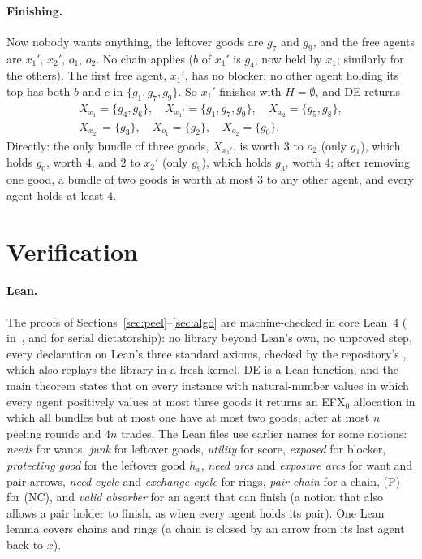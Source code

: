\documentclass[runningheads,11pt]{llncs}
\newcommand{\efxz}{\texorpdfstring{\mbox{EFX$_0$}}{EFX0}}
\newcommand{\DE}{\textup{DE}}
\begin{document}
\paragraph{Finishing.} Now nobody wants anything, the leftover goods are $g_7$ and $g_9$, and the free agents are $x_1'$, $x_2'$, $o_1$, $o_2$. No chain applies ($b$ of $x_1'$ is $g_4$, now held by $x_1$; similarly for the others). The first free agent, $x_1'$, has no blocker: no other agent holding its top has both $b$ and $c$ in $\{g_1,g_7,g_9\}$. So $x_1'$ finishes with $H=\emptyset$, and \DE{} returns
\begin{gather*}
X_{x_1}=\{g_4,g_6\},\quad X_{x_1'}=\{g_1,g_7,g_9\},\quad X_{x_2}=\{g_5,g_8\},\\
X_{x_2'}=\{g_3\},\quad X_{o_1}=\{g_2\},\quad X_{o_2}=\{g_0\}.
\end{gather*}
Directly: the only bundle of three goods, $X_{x_1'}$, is worth $3$ to $o_2$ (only $g_1$), which holds $g_0$, worth $4$, and $2$ to $x_2'$ (only $g_9$), which holds $g_3$, worth $4$; after removing one good, a bundle of two goods is worth at most $3$ to any other agent, and every agent holds at least $4$.

\section{Verification}\label{sec:evidence}

\paragraph{Lean.} The proofs of Sections~\ref{sec:peel}--\ref{sec:algo} are machine-checked in core Lean~4 ( in~\cite{Repo}, and  for serial dictatorship): no library beyond Lean's own, no unproved step, every declaration on Lean's three standard axioms, checked by the repository's , which also replays the library in a fresh kernel. \DE{} is a Lean function, and the main theorem states that on every instance with natural-number values in which every agent positively values at most three goods it returns an \efxz{} allocation in which all bundles but at most one have at most two goods, after at most $n$ peeling rounds and $4n$ trades. The Lean files use earlier names for some notions: \emph{needs} for wants, \emph{junk} for leftover goods, \emph{utility} for score, \emph{exposed} for blocker, \emph{protecting good} for the leftover good $h_x$, \emph{need arcs} and \emph{exposure arcs} for want and pair arrows, \emph{need cycle} and \emph{exchange cycle} for rings, \emph{pair chain} for a chain, (P) for (NC), and \emph{valid absorber} for an agent that can finish (a notion that also allows a pair holder to finish, as when every agent holds its pair). One Lean lemma covers chains and rings (a chain is closed by an arrow from its last agent back to $x$).
\end{document}

